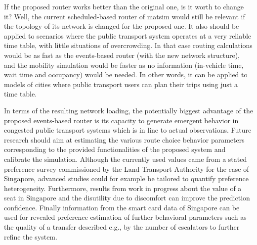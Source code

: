 If the proposed router works better than the original one, is it worth to change it? Well, the current scheduled-based router of \gls{matsim} would still be relevant if the topology of its network is changed for the proposed one. It also should be applied to scenarios where the public transport system operates at a very reliable time table, with little situations of overcrowding. In that case routing calculations would be as fast as the events-based router (with the new network structure), and the mobility simulation would be faster as no information (in-vehicle time, wait time and occupancy) would be needed. In other words, it can be applied to models of cities where public transport users can plan their trips using just a time table.

In terms of the resulting network loading, the potentially biggest advantage of the proposed events-based router is its capacity to generate emergent behavior in congested public transport systems which is in line to actual observations. Future research should aim at estimating the various route choice behavior parameters corresponding to the provided functionalities of the proposed system and calibrate the simulation. Although the currently used values came from a stated preference survey commissioned by the Land Transport Authority for the case of Singapore, advanced studies could for example be tailored to quantify preference heterogeneity. Furthermore, results from work in progress about the value of a seat in Singapore and the disutility due to discomfort can improve the prediction confidence. Finally information from the smart card data of Singapore can be used for revealed preference estimation of further behavioral parameters such as the quality of a transfer described e.g., by the number of escalators to further refine the system.





